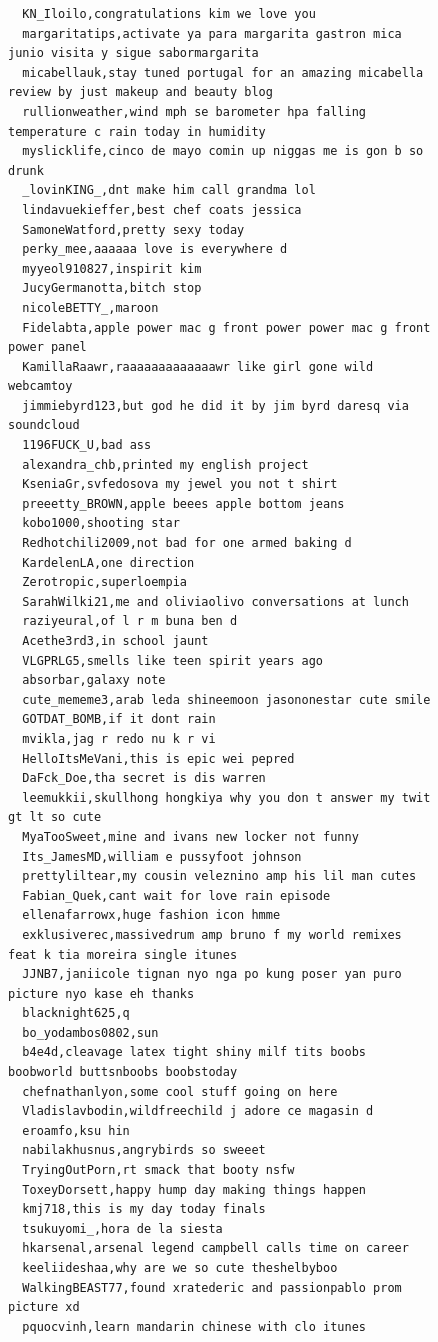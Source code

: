 \begin{figure}[htpb]
\begin{verbatim}
  KN_Iloilo,congratulations kim we love you
  margaritatips,activate ya para margarita gastron mica junio visita y sigue sabormargarita
  micabellauk,stay tuned portugal for an amazing micabella review by just makeup and beauty blog
  rullionweather,wind mph se barometer hpa falling temperature c rain today in humidity
  myslicklife,cinco de mayo comin up niggas me is gon b so drunk
  _lovinKING_,dnt make him call grandma lol
  lindavuekieffer,best chef coats jessica
  SamoneWatford,pretty sexy today
  perky_mee,aaaaaa love is everywhere d
  myyeol910827,inspirit kim
  JucyGermanotta,bitch stop
  nicoleBETTY_,maroon
  Fidelabta,apple power mac g front power power mac g front power panel
  KamillaRaawr,raaaaaaaaaaaaawr like girl gone wild webcamtoy
  jimmiebyrd123,but god he did it by jim byrd daresq via soundcloud
  1196FUCK_U,bad ass
  alexandra_chb,printed my english project
  KseniaGr,svfedosova my jewel you not t shirt
  preeetty_BROWN,apple beees apple bottom jeans
  kobo1000,shooting star
  Redhotchili2009,not bad for one armed baking d
  KardelenLA,one direction
  Zerotropic,superloempia
  SarahWilki21,me and oliviaolivo conversations at lunch
  raziyeural,of l r m buna ben d
  Acethe3rd3,in school jaunt
  VLGPRLG5,smells like teen spirit years ago
  absorbar,galaxy note
  cute_mememe3,arab leda shineemoon jasononestar cute smile
  GOTDAT_BOMB,if it dont rain
  mvikla,jag r redo nu k r vi
  HelloItsMeVani,this is epic wei pepred
  DaFck_Doe,tha secret is dis warren
  leemukkii,skullhong hongkiya why you don t answer my twit gt lt so cute
  MyaTooSweet,mine and ivans new locker not funny
  Its_JamesMD,william e pussyfoot johnson
  prettyliltear,my cousin veleznino amp his lil man cutes
  Fabian_Quek,cant wait for love rain episode
  ellenafarrowx,huge fashion icon hmme
  exklusiverec,massivedrum amp bruno f my world remixes feat k tia moreira single itunes
  JJNB7,janiicole tignan nyo nga po kung poser yan puro picture nyo kase eh thanks
  blacknight625,q
  bo_yodambos0802,sun
  b4e4d,cleavage latex tight shiny milf tits boobs boobworld buttsnboobs boobstoday
  chefnathanlyon,some cool stuff going on here
  Vladislavbodin,wildfreechild j adore ce magasin d
  eroamfo,ksu hin
  nabilakhusnus,angrybirds so sweeet
  TryingOutPorn,rt smack that booty nsfw
  ToxeyDorsett,happy hump day making things happen
  kmj718,this is my day today finals
  tsukuyomi_,hora de la siesta
  hkarsenal,arsenal legend campbell calls time on career
  keeliideshaa,why are we so cute theshelbyboo
  WalkingBEAST77,found xratederic and passionpablo prom picture xd
  pquocvinh,learn mandarin chinese with clo itunes

\end{verbatim}
\end{figure}
